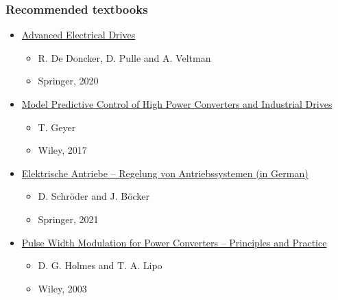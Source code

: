 \begin{frame}
    \frametitle{Recommended textbooks}
    \begin{itemize}
        \item \href{https://link.springer.com/book/10.1007/978-3-030-48977-9}{Advanced Electrical Drives}
              \begin{itemize}
                  \item R. De Doncker, D. Pulle and A. Veltman
                  \item Springer, 2020
              \end{itemize}
              \vspace{0.3cm}
              \pause
        \item \href{https://onlinelibrary.wiley.com/doi/book/10.1002/9781119010883}{Model Predictive Control of High Power Converters and Industrial Drives}
              \begin{itemize}
                  \item T. Geyer
                  \item Wiley, 2017
              \end{itemize}
              \vspace{0.3cm}
              \pause
        \item  \href{https://link.springer.com/book/10.1007/978-3-662-62700-6}{Elektrische Antriebe -- Regelung von Antriebssystemen (in German)}
              \begin{itemize}
                  \item D. Schröder and J. Böcker
                  \item Springer, 2021
              \end{itemize}
              \vspace{0.3cm}
              \pause
        \item \href{https://www.wiley-vch.de/de/fachgebiete/ingenieurwesen/pulse-width-modulation-for-power-converters-978-0-471-20814-3}{Pulse Width Modulation for Power Converters -- Principles and Practice}
              \begin{itemize}
                  \item D. G. Holmes and T. A. Lipo
                  \item Wiley, 2003
              \end{itemize}
    \end{itemize}
\end{frame}

